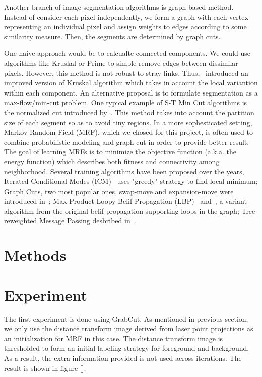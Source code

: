 \documentclass{article} %
\begin{document}
Another branch of image segmentation algorithms is graph-based method. Instead of consider each pixel independently, we form a graph with each vertex representing an individual pixel and assign weights to edges according to some similarity measure. Then, the segments are determined by graph cuts.

One naive approach would be to calcualte connected components. We could use algorithms like Kruskal or Prime to simple remove edges between dissimilar pixels. However, this method is not robust to stray links. Thus,~\citep{Felzenszwalb2004Efficient} introduced an improved version of Kruskal algorithm which takes in account the local variantion within each component. An alternative proposal is to formulate segmentation as a max-flow/min-cut problem. One typical example of S-T Min Cut algorithms is the normalized cut introduced by~\citep{Shi2000Normalized}. This method takes into account the partition size of each segment so as to avoid tiny regions. In a more sophesticated setting, Markov Random Field (MRF), which we chosed for this project, is often used to combine probabilistic modeling and graph cut in order to provide better result. The goal of learning MRFs is to minimize the objective function (a.k.a. the energy function) which describes both fitness and connectivity among neighborhood. Several training algorithms have been proposed over the years, Iterated Conditional Modes (ICM)~\citep{Besag1986statisticalanalysis} uses "greedy" strategy to find local minimum; Graph Cuts, two most popular ones, swap-move and expansion-move were introduced in~\citep{Boykov2001Fast}; Max-Product Loopy Belif Propagation (LBP)~\citep{Felzenszwalb2004Efficient} and~\citep{Freeman2000lowlevel}, a variant algorithm from the original belif propagation supporting loops in the graph; Tree-reweighted Message Passing desbribed in~\citep{Kolmogorov2006messagepassing}.

\section{Methods}
\section{Experiment}
The first experiment is done using GrabCut. As mentioned in previous section, we only use the distance transform image derived from laser point projections as an initialization for MRF in this case. The distance transform image is thresholded to form an initial labeling strategy for foreground and background. As a result, the extra information provided is not used across iterations. The result is shown in figure []. 
\end{document}
